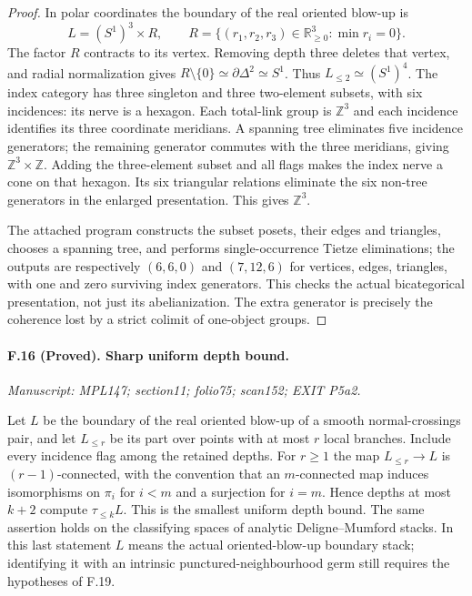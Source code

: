 \begin{proof}
In polar coordinates the boundary of the real oriented blow-up is
\[
 L=(S^1)^3\times R,\qquad
 R=\{(r_1,r_2,r_3)\in\mathbb R_{\geq0}^3:\min r_i=0\}.
\]
The factor $R$ contracts to its vertex. Removing depth three deletes
that vertex, and radial normalization gives $R\setminus\{0\}\simeq
\partial\Delta^2\simeq S^1$. Thus $L_{\leq2}\simeq(S^1)^4$.
The index category has three singleton and three two-element subsets,
with six incidences: its nerve is a hexagon. Each total-link group is
$\mathbb Z^3$ and each incidence identifies its three coordinate
meridians. A spanning tree eliminates five incidence generators; the
remaining generator commutes with the three meridians, giving
$\mathbb Z^3\times\mathbb Z$. Adding the three-element subset and all
flags makes the index nerve a cone on that hexagon. Its six triangular
relations eliminate the six non-tree generators in the enlarged
presentation. This gives $\mathbb Z^3$.

The attached program constructs the subset posets, their edges and
triangles, chooses a spanning tree, and performs single-occurrence
Tietze eliminations; the outputs are respectively $(6,6,0)$ and
$(7,12,6)$ for vertices, edges, triangles, with one and zero surviving
index generators. This checks the actual bicategorical presentation,
not just its abelianization. The extra generator is precisely the
coherence lost by a strict colimit of one-object groups.
\end{proof}

\paragraph{F.16 (Proved). Sharp uniform depth bound.}
\textit{Manuscript: MPL147; section11; folio75; scan152; EXIT P5a2.}

Let $L$ be the boundary of the real oriented blow-up of a smooth
normal-crossings pair, and let $L_{\leq r}$ be its part over points
with at most $r$ local branches. Include every incidence flag among
the retained depths. For $r\geq1$ the map
$L_{\leq r}\to L$ is $(r-1)$-connected, with the convention that an
$m$-connected map induces isomorphisms on $\pi_i$ for $i<m$ and a
surjection for $i=m$. Hence depths at most $k+2$ compute
$\tau_{\leq k}L$. This is the smallest uniform depth bound. The same
assertion holds on the classifying spaces of analytic
Deligne--Mumford stacks. In this last statement $L$ means the actual
oriented-blow-up boundary stack; identifying it with an intrinsic
punctured-neighbourhood germ still requires the hypotheses of F.19.

